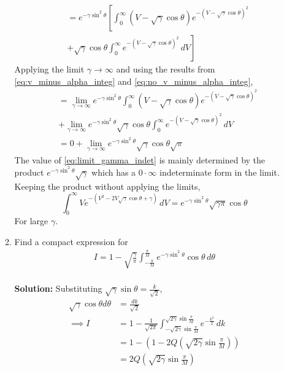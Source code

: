 \documentclass[journal,8pt,onecolumn]{IEEEtran}
\providecommand{\qfunc}[1]{\ensuremath{Q\left(#1\right)}}
\providecommand{\brak}[1]{\ensuremath{\left(#1\right)}}
\newcommand{\solution}{\noindent \textbf{Solution: }}
\begin{document}
\begin{enumerate}
\begin{enumerate}[label=(\alph{enumii})]
\begin{align*}
	&=e^{-\gamma\sin^2 \theta}\left[\int_{0}^{\infty}\brak{V-\sqrt{\gamma}\cos \theta}e^{-\brak{V - \sqrt{\gamma}\cos \theta}^2}\right.\\
	&\left.+\sqrt{\gamma}\cos \theta \int_{0}^{\infty}e^{-\brak{V - \sqrt{\gamma}\cos \theta}^2}\,dV\right]
\end{align*}
Applying the limit $\gamma \rightarrow \infty$ and using the results from \eqref{eq:v_minus_alpha_integ} and \eqref{eq:no_v_minus_alpha_integ},
\begin{align}
	\nonumber
	&=\lim_{\gamma \rightarrow \infty}e^{-\gamma\sin^2 \theta}\int_{0}^{\infty}\brak{V-\sqrt{\gamma}\cos \theta}e^{-\brak{V - \sqrt{\gamma}\cos \theta}^2}\\
	\nonumber
	&+\lim_{\gamma \rightarrow \infty}e^{-\gamma\sin^2 \theta}\sqrt{\gamma}\cos \theta \int_{0}^{\infty}e^{-\brak{V - \sqrt{\gamma}\cos \theta}^2}\,dV\\
	\label{eq:limit_gamma_indet}
	&=0+\lim_{\gamma \rightarrow \infty}e^{-\gamma\sin^2 \theta}\sqrt{\gamma}\cos \theta \sqrt{\pi}
\end{align}
The value of \eqref{eq:limit_gamma_indet} is mainly determined by the product $e^{-\gamma\sin^2 \theta}\sqrt{\gamma}$ which has a $0\cdot\infty$ %
indeterminate form in the limit. Keeping the product without applying the limits,
\begin{equation}
	\int_{0}^{\infty}Ve^{-\brak{V^2 - 2V \sqrt{\gamma}\cos \theta +\gamma}}\,dV = e^{-\gamma\sin^2 \theta}\sqrt{\gamma\pi}\cos \theta
	\label{eq:v_integral_large_gamma}
\end{equation}
For large $\gamma$.
\item
Find a compact expression for 
%
\begin{align}
I = 1 - \sqrt{\frac{\gamma}{\pi}}\int_{-\frac{\pi}{M}}^{\frac{\pi}{M}}e^{- \gamma\sin^2\theta }\cos \theta\, d\theta
\end{align}\\
\solution Substituting $\sqrt{\gamma}\sin \theta=\frac{k}{\sqrt{2}}$,
\begin{align}
	\nonumber
	\sqrt{\gamma}\cos \theta d\theta &= \frac{dk}{\sqrt{2}}\\
	\nonumber
	\implies I &= 1 - \frac{1}{\sqrt{2\pi}}\int_{-\sqrt{2\gamma}\sin \frac{\pi}{M}}^{\sqrt{2\gamma}\sin \frac{\pi}{M}}e^{-\frac{k^2}{2}}\, dk\\
	\nonumber
	&= 1 - \left(1 - 2\qfunc{\sqrt{2\gamma}\sin \frac{\pi}{M}}\right)\\
	\label{eq:I_sector_Q_func}
	&= 2\qfunc{\sqrt{2\gamma}\sin \frac{\pi}{M}}\\

\end{align}
\end{enumerate}
\end{enumerate}
\end{document}
